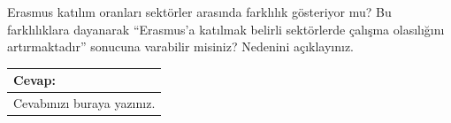 \documentclass[
  11pt,
  a4paper,
  DIV=11,
  numbers=noendperiod]{scrartcl}
\begin{document}
Erasmus katılım oranları sektörler arasında farklılık gösteriyor mu? Bu
farklılıklara dayanarak ``Erasmus'a katılmak belirli sektörlerde çalışma
olasılığını artırmaktadır'' sonucuna varabilir misiniz? Nedenini
açıklayınız.

\begin{longtable}[]{@{}l@{}}
\toprule\noalign{}
Cevap: \\
\midrule\noalign{}
\endhead
\bottomrule\noalign{}
\endlastfoot
Cevabınızı buraya yazınız. \\
\end{longtable}
\end{document}
